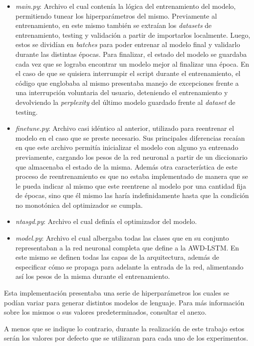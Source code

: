 \begin{itemize}
    \item \textit{main.py}: Archivo el cual contenía la lógica del entrenamiento del modelo, permitiendo tunear los hiperparámetros del mismo. Previamente al entrenamiento, en este mismo también se extraían los \textit{datasets} de entrenamiento, testing y validación a partir de importarlos localmente. Luego, estos se dividían en \textit{batches} para poder entrenar al modelo final y validarlo durante las distintas épocas. Para finalizar, el estado del modelo se guardaba cada vez que se lograba encontrar un modelo mejor al finalizar una época. En el caso de que se quisiera interrumpir el script durante el entrenamiento, el código que englobaba al mismo presentaba manejo de excepciones frente a una interrupción voluntaria del usuario, deteniendo el entrenamiento y devolviendo la \textit{perplexity} del último modelo guardado frente al \textit{dataset} de testing.
    \item \textit{finetune.py}: Archivo casi idéntico al anterior, utilizado para reentrenar el modelo en el caso que se preste necesario. Sus principales diferencias recaían en que este archivo permitía inicializar el modelo con alguno ya entrenado previamente, cargando los pesos de la red neuronal a partir de un diccionario que almacenaba el estado de la misma. Además otra característica de este proceso de reentrenamiento es que no estaba implementado de manera que se le pueda indicar al mismo que este reentrene al modelo por una cantidad fija de épocas, sino que él mismo las haría indefinidamente hasta que la condición no monotónica del optimizador se cumpla.
    \item \textit{ntasgd.py}: Archivo el cual definía el optimizador del modelo.
    \item \textit{model.py}: Archivo el cual albergaba todas las clases que en su conjunto representaban a la red neuronal completa que define a la AWD-LSTM. En este mismo se definen todas las capas de la arquitectura, además de especificar cómo se propaga para adelante la entrada de la red, alimentando así los pesos de la misma durante el entrenamiento.
\end{itemize}

Esta implementación presentaba una serie de hiperparámetros los cuales se podían variar para generar distintos modelos de lenguaje. Para más información sobre los mismos o sus valores predeterminados, consultar el anexo.

A menos que se indique lo contrario, durante la realización de este trabajo estos serán los valores por defecto que se utilizaran para cada uno de los experimentos.

